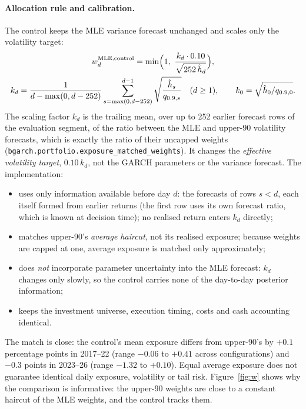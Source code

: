 \documentclass[11pt]{article}
\begin{document}
\paragraph{Allocation rule and calibration.} The control keeps the MLE variance forecast unchanged and scales only the
volatility target:
\begin{equation}\label{eq:control}
\begin{gathered}
w_d^{\text{MLE,control}}=\min\Bigl(1,\ \frac{k_d\cdot0.10}{\sqrt{252\,\hat h_d}}\Bigr),\\
k_d=\frac{1}{d-\max(0,d-252)}\sum_{s=\max(0,d-252)}^{d-1}\sqrt{\frac{\hat h_s}{q_{0.9,s}}}\quad(d\ge1),\qquad k_0=\sqrt{\hat h_0/q_{0.9,0}}.
\end{gathered}
\end{equation}
The scaling factor $k_d$ is the trailing mean, over up to 252 earlier forecast rows of the evaluation segment, of the
ratio between the MLE and upper-90 volatility forecasts, which is exactly the ratio of their uncapped weights
(\texttt{bgarch.portfolio.exposure\_matched\_weights}). It changes the \emph{effective volatility target}, $0.10\,k_d$,
not the GARCH parameters or the variance forecast. The implementation:
\begin{itemize}
\item uses only information available before day $d$: the forecasts of rows $s<d$, each itself formed from earlier
returns (the first row uses its own forecast ratio, which is known at decision time); no realised return enters $k_d$
directly;
\item matches upper-90's \emph{average haircut}, not its realised exposure; because weights are capped at one, average
exposure is matched only approximately;
\item does \emph{not} incorporate parameter uncertainty into the MLE forecast: $k_d$ changes only slowly, so the control
carries none of the day-to-day posterior information;
\item keeps the investment universe, execution timing, costs and cash accounting identical.
\end{itemize}
The match is close: the control's mean exposure differs from upper-90's by $+0.1$ percentage points in 2017--22 (range
$-0.06$ to $+0.41$ across configurations) and $-0.3$ points in 2023--26 (range $-1.32$ to $+0.10$). Equal average
exposure does not guarantee identical daily exposure, volatility or tail risk. Figure~\ref{fig:w} shows why the
comparison is informative: the upper-90 weights are close to a constant haircut of the MLE weights, and the control
tracks them.
\end{document}
